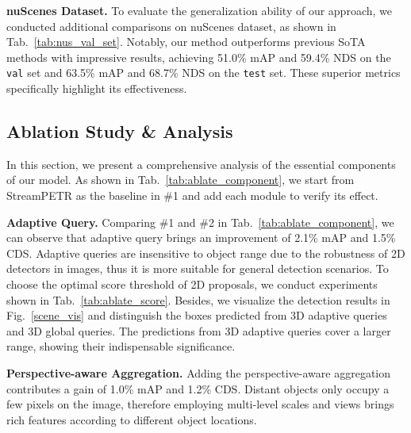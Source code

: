 \documentclass[letterpaper]{article} \usepackage{aaai24}
\begin{document}
\noindent\textbf{nuScenes Dataset.}
To evaluate the generalization ability of our approach, we conducted additional comparisons on nuScenes dataset, as shown in Tab.~\ref{tab:nus_val_set}. Notably, our method outperforms previous SoTA methods with impressive results, achieving 51.0\% mAP and 59.4\% NDS on the \texttt{val} set and 63.5\% mAP and 68.7\% NDS on the \texttt{test} set. These superior metrics specifically highlight its effectiveness.





\subsection{Ablation Study \& Analysis} \label{sec:ablate}


In this section, we present a comprehensive analysis of the essential components of our model. As shown in Tab.~\ref{tab:ablate_component}, we start from StreamPETR as the baseline in \#1 and add each module to verify its effect. 



\noindent\textbf{Adaptive Query.}
Comparing \#1 and \#2 in Tab.~\ref{tab:ablate_component}, we can observe that adaptive query brings an improvement of 2.1\% mAP and 1.5\% CDS. Adaptive queries are insensitive to object range due to the robustness of 2D detectors in images, thus it is more suitable for general detection scenarios. 
To choose the optimal score threshold of 2D proposals, we conduct experiments shown in Tab.~\ref{tab:ablate_score}. Besides, we visualize the detection results in Fig.~\ref{scene_vis} and distinguish the boxes predicted from 3D adaptive queries and 3D global queries. The predictions from 3D adaptive queries cover a larger range, showing their indispensable significance.


\noindent\textbf{Perspective-aware Aggregation.} Adding the perspective-aware aggregation contributes a gain of 1.0\% mAP and 1.2\% CDS. Distant objects only occupy a few pixels on the image, therefore employing multi-level scales and views brings rich features according to different object locations. 
\end{document}
